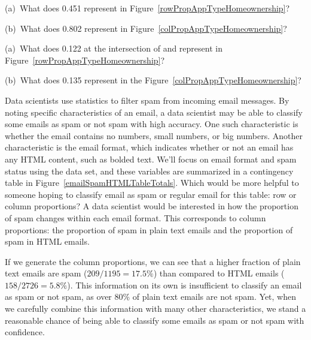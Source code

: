 \begin{exercisewrap}
\begin{nexercise}
(a)~What does 0.451 represent in
Figure~\ref{rowPropAppTypeHomeownership}?

(b)~What does 0.802 represent in
Figure~\ref{colPropAppTypeHomeownership}?\footnotemark{}
\end{nexercise}
\end{exercisewrap}

\begin{exercisewrap}
\begin{nexercise}
(a)~What does 0.122 at the intersection of  and
 represent in
Figure~\ref{rowPropAppTypeHomeownership}?

(b)~What does 0.135 represent in the
Figure~\ref{colPropAppTypeHomeownership}?\footnotemark{}
\end{nexercise}
\end{exercisewrap}

\begin{examplewrap}
\begin{nexample}{
    Data scientists use statistics to filter spam from incoming
    email messages.
    By noting specific characteristics of an email,
    a data scientist may be able to classify some emails as spam
    or not spam with high accuracy.
    One such characteristic is whether the email
    contains no numbers, small numbers, or big numbers.
    Another characteristic is the email format, which
    indicates whether or not an email has any HTML content,
    such as bolded text.
    We'll focus on email format and spam status using the
     data set, and these variables are summarized
    in a contingency table in
    Figure~\ref{emailSpamHTMLTableTotals}.
    Which would be more helpful to someone hoping to classify
    email as spam or regular email for this table:
    row or column proportions?}
  \label{weighingRowColumnProportions}
  A data scientist would be interested in how the proportion
  of spam changes within each email format.
  This corresponds to column proportions:
  the proportion of spam in plain text emails
  and the proportion of spam in HTML emails.

  If we generate the column proportions, we can see
  that a higher fraction of plain text emails are
  spam ($209/1195 = 17.5\%$)
  than compared to HTML emails ($158/2726 = 5.8\%$).
  This information on its own is insufficient to classify
  an email as spam or not spam, as over 80\% of plain text
  emails are not spam.
  Yet, when we carefully combine this information with many
  other characteristics,
  we stand a reasonable chance of being able to classify
  some emails as spam or not spam with confidence.
\end{nexample}
\end{examplewrap}


